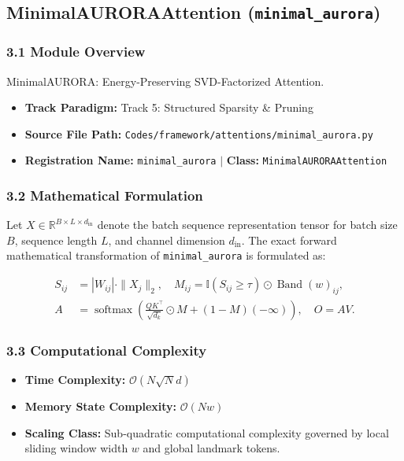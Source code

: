 \subsection{MinimalAURORAAttention (\texttt{minimal\_aurora})}
\label{sec:app_module_minimal_aurora}

\subsubsection*{3.1 Module Overview}
MinimalAURORA: Energy-Preserving SVD-Factorized Attention.
\begin{itemize}
    \item \textbf{Track Paradigm:} Track 5: Structured Sparsity \& Pruning
    \item \textbf{Source File Path:} \texttt{Codes/framework/attentions/minimal\_aurora.py}
    \item \textbf{Registration Name:} \texttt{minimal\_aurora} $\mid$ \textbf{Class:} \texttt{MinimalAURORAAttention}
\end{itemize}

\subsubsection*{3.2 Mathematical Formulation}
Let $X \in \mathbb{R}^{B \times L \times d_{\text{in}}}$ denote the batch sequence representation tensor for batch size $B$, sequence length $L$, and channel dimension $d_{\text{in}}$. The exact forward mathematical transformation of \texttt{minimal\_aurora} is formulated as:

\begin{align}
S_{ij} &= |W_{ij}| \cdot \|X_j\|_2, \quad M_{ij} = \mathbb{I}(S_{ij} \ge \tau) \odot \operatorname{Band}(w)_{ij}, \\
A &= \operatorname{softmax}\left(\frac{Q K^\top}{\sqrt{d_k}} \odot M + (1 - M)(-\infty)\right), \quad O = A V.
\end{align}


\subsubsection*{3.3 Computational Complexity}
\begin{itemize}
    \item \textbf{Time Complexity:} $\mathcal{O}(N \sqrt{N} d)$
    \item \textbf{Memory State Complexity:} $\mathcal{O}(N w)$
    \item \textbf{Scaling Class:} Sub-quadratic computational complexity governed by local sliding window width $w$ and global landmark tokens.
\end{itemize}

